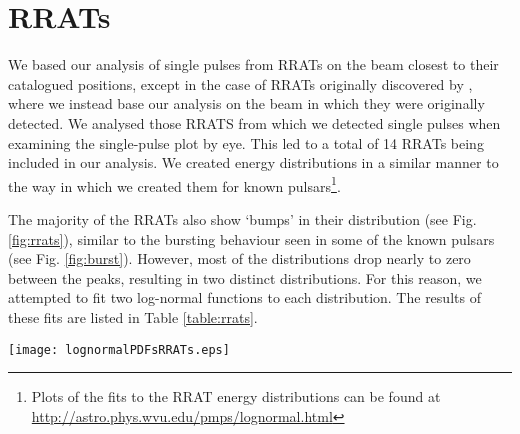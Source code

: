 \documentclass[fleqn,usenatbib]{mnras}
\begin{document}
\section{RRATs}
\label{rrats}

We based our analysis of single pulses from RRATs on the beam closest to their catalogued positions, except in the case of RRATs originally discovered by \citet{McLaughlin:2006}, where we instead base our analysis on the beam in which they were originally detected. We analysed those RRATS from which we detected single pulses when examining 
the single-pulse plot by eye. This led to a total of 14 RRATs being included in our analysis.
We created energy distributions in a similar manner to the way in which we created them for 
known pulsars\footnote{Plots of the fits to the RRAT energy distributions can be found at \url{http://astro.phys.wvu.edu/pmps/lognormal.html}}.

The majority of the RRATs also show `bumps' in their distribution (see Fig. \ref{fig:rrats}), 
similar to the bursting behaviour seen in some of the known pulsars (see Fig. \ref{fig:burst}). However, most of the distributions drop nearly to zero between the peaks, resulting in two distinct distributions. For this reason, we attempted to fit two log-normal functions to each distribution. The results of these fits are listed in Table \ref{table:rrats}.

\begin{figure*}
\centering
\texttt{[image: lognormalPDFsRRATs.eps]}
\caption[Examples of Log-normal Fits to RRAT Amplitude Distributions]{Amplitude distributions for RRATs with log-normal fits. The plot on the left is one of the two examples of RRATs which do not exhibit `bumps' on their amplitude distributions, while the plot on the right shows this `bump', as do most of the RRATs we analysed. The RRATs are, from left to right, J1826$-$1419 and J1846$-$0257. The dashed vertical lines represent our detection thresholds.}
\label{fig:rrats}
\end{figure*}
\end{document}
